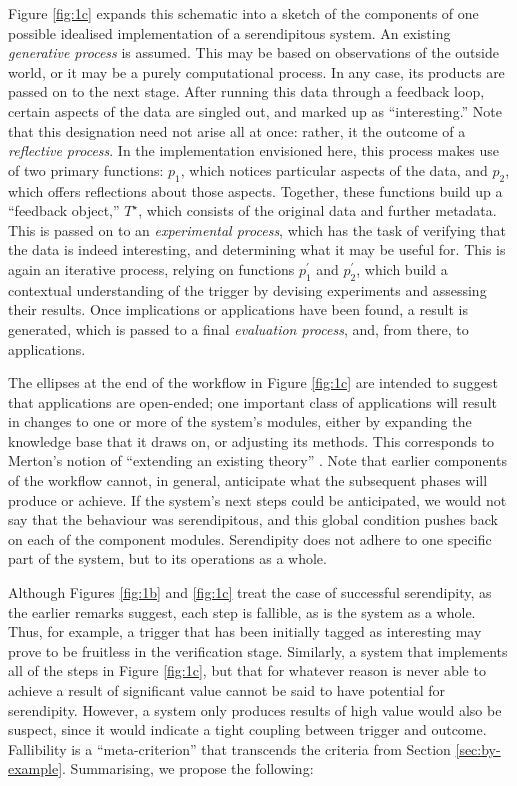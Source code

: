 Figure \ref{fig:1c} expands this schematic into a sketch of the
components of one possible idealised implementation of a serendipitous
system.  An existing \emph{generative process} is assumed.  This may
be based on observations of the outside world, or it may be a purely
computational process.  In any case, its products are passed on to the
next stage.  After running this data through a feedback loop, certain
aspects of the data are singled out, and marked up as
``interesting.''  Note that this designation need not arise all at
once: rather, it the outcome of a \emph{reflective process}.  In the
implementation envisioned here, this process makes use of two primary
functions: $p_1$, which notices particular aspects of the data, and $p_2$, which
offers reflections about those aspects.  Together, these functions build up a
``feedback object,'' $T^{\star}$, which consists of the original data
and further metadata.  This is passed on to an \emph{experimental
  process}, which has the task of verifying that the data
is indeed interesting, and determining what it may be useful for.
This is again an iterative process, relying on functions $p^{\prime}_1$ and $p^{\prime}_2$, which
build a contextual understanding of the trigger by devising experiments and
assessing their results.  Once implications or applications have been found, a result is
generated, which is passed to a final \emph{evaluation process}, and,
from there, to applications.

The ellipses at the end of the workflow in Figure \ref{fig:1c} are
intended to suggest that applications are open-ended; one
important class of applications will result in changes to one or more
of the system's modules, either by expanding the knowledge base
that it draws on, or adjusting its methods.
This corresponds to Merton's notion of ``extending an existing theory''
\cite{merton1948bearing}.
Note that earlier components of the workflow
cannot, in general, anticipate what the subsequent phases will produce
or achieve.  If the system's next steps could be anticipated, we would
not say that the behaviour was serendipitous, and this global condition pushes back on each of the component modules.  
Serendipity does not adhere to one specific part of the system, but to
its operations as a whole.  

Although Figures \ref{fig:1b} and \ref{fig:1c} treat the case of
successful serendipity, as the earlier remarks suggest, each step is
fallible, as is the system as a whole.  Thus, for example, a trigger
that has been initially tagged as interesting may prove to be
fruitless in the verification stage.  Similarly, a system that
implements all of the steps in Figure \ref{fig:1c}, but that for
whatever reason is never able to achieve a result of significant value
cannot be said to have potential for serendipity.  However, a system
only produces results of high value would also be suspect, since it
would indicate a tight coupling between trigger and outcome.
Fallibility is a ``meta-criterion'' that transcends the criteria from
Section \ref{sec:by-example}.  Summarising, we propose the following:

